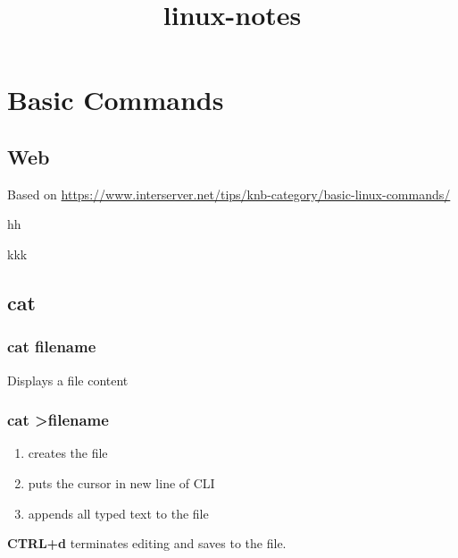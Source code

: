 \documentclass{report}
\title{linux-notes}
\begin{document}
	
	


\part{Basic Commands}



\chapter{Web}
Based on \url{https://www.interserver.net/tips/knb-category/basic-linux-commands/}

hh

kkk

\chapter{cat}


\section{cat filename}
Displays a file content


\section{cat \textgreater filename}
\begin{enumerate}
	\item creates the file
	\item puts the cursor in new line of CLI
	\item appends all typed text to the file
\end{enumerate}
\textbf{CTRL+d} terminates editing and saves to the file.
	
	
	
\end{document}
